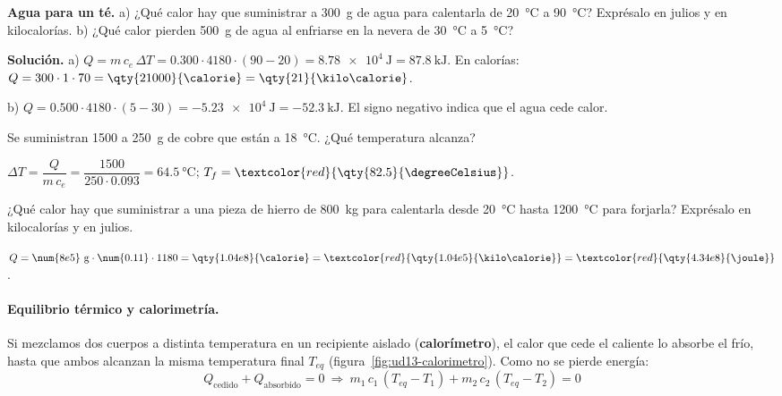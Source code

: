 \begin{example}
    \textbf{Agua para un té.} a) ¿Qué calor hay que suministrar a \qty{300}{\g} de agua para calentarla de \qty{20}{\degreeCelsius} a
    \qty{90}{\degreeCelsius}? Exprésalo en julios y en kilocalorías. b) ¿Qué calor pierden \qty{500}{\g} de agua al enfriarse en
    la nevera de \qty{30}{\degreeCelsius} a \qty{5}{\degreeCelsius}?

    \textbf{Solución.} a) \(Q = m\,c_e\,\Delta T = \num{0.300} \cdot 4180 \cdot (90 - 20) = \qty{8.78e4}{\joule} = \qty{87.8}{\kilo\joule}\).
    En calorías: \(Q = 300 \cdot 1 \cdot 70 = \qty{21000}{\calorie} = \qty{21}{\kilo\calorie}\).

    b) \(Q = \num{0.500} \cdot 4180 \cdot (5 - 30) = \qty{-5.23e4}{\joule} = \qty{-52.3}{\kilo\joule}\). El signo negativo indica
    que el agua cede calor.
\end{example}

\begin{exercise}
    Se suministran \qty{1500}{\calorie} a \qty{250}{\g} de cobre que están a \qty{18}{\degreeCelsius}. ¿Qué temperatura alcanza?
    \begin{solu}
        \(\Delta T = \dfrac{Q}{m\,c_e} = \dfrac{1500}{250 \cdot \num{0.093}} = \qty{64.5}{\degreeCelsius}\);
        \(T_f = \textcolor{red}{\qty{82.5}{\degreeCelsius}}\).
    \end{solu}
\end{exercise}

\begin{exercise}
    ¿Qué calor hay que suministrar a una pieza de hierro de \qty{800}{\kg} para calentarla desde \qty{20}{\degreeCelsius} hasta
    \qty{1200}{\degreeCelsius} para forjarla? Exprésalo en kilocalorías y en julios.
    \begin{solu}
        \(Q = \num{8e5}~\mathrm{g} \cdot \num{0.11} \cdot 1180 = \qty{1.04e8}{\calorie} = \textcolor{red}{\qty{1.04e5}{\kilo\calorie}}
        = \textcolor{red}{\qty{4.34e8}{\joule}}\).
    \end{solu}
\end{exercise}

\paragraph{Equilibrio térmico y calorimetría.} Si mezclamos dos cuerpos a distinta temperatura en un recipiente aislado
(\textbf{calorímetro}), el calor que cede el caliente lo absorbe el frío, hasta que ambos alcanzan la misma temperatura final
\(T_{eq}\) (figura~\ref{fig:ud13-calorimetro}). Como no se pierde energía:
\[ Q_{\text{cedido}} + Q_{\text{absorbido}} = 0 \ \Rightarrow \ m_1\,c_1\,(T_{eq} - T_1) + m_2\,c_2\,(T_{eq} - T_2) = 0 \]

